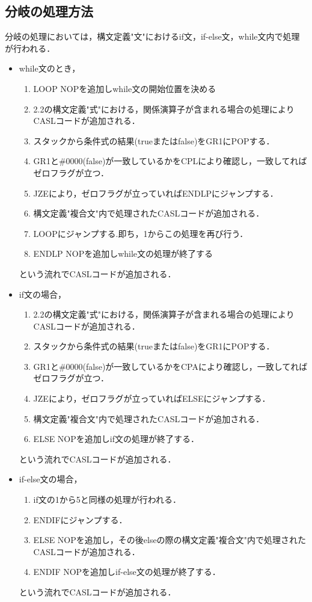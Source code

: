 \documentclass[dvipdfmx]{jarticle}
\begin{document}
\subsection{分岐の処理方法}
分岐の処理においては，構文定義"文"におけるif文，if-else文，while文内で処理が行われる．
\begin{itemize}
  \item while文のとき，
  \begin{enumerate}
    \item LOOP NOPを追加しwhile文の開始位置を決める
    \item 2.2の構文定義"式"における，関係演算子が含まれる場合の処理によりCASLコードが追加される．
    \item スタックから条件式の結果(trueまたはfalse)をGR1にPOPする．
    \item GR1と\#0000(false)が一致しているかをCPLにより確認し，一致してればゼロフラグが立つ．
    \item JZEにより，ゼロフラグが立っていればENDLPにジャンプする．
    \item 構文定義"複合文"内で処理されたCASLコードが追加される．
    \item LOOPにジャンプする.即ち，1からこの処理を再び行う．
    \item ENDLP NOPを追加しwhile文の処理が終了する
  \end{enumerate}
  という流れでCASLコードが追加される．
  \item if文の場合，
  \begin{enumerate}
    \item 2.2の構文定義"式"における，関係演算子が含まれる場合の処理によりCASLコードが追加される．
    \item スタックから条件式の結果(trueまたはfalse)をGR1にPOPする．
    \item GR1と\#0000(false)が一致しているかをCPAにより確認し，一致してればゼロフラグが立つ．
    \item JZEにより，ゼロフラグが立っていればELSEにジャンプする．
    \item 構文定義"複合文"内で処理されたCASLコードが追加される．
    \item ELSE NOPを追加しif文の処理が終了する．
  \end{enumerate}
  という流れでCASLコードが追加される．
  \item if-else文の場合，
  \begin{enumerate}
    \item if文の1から5と同様の処理が行われる．
    \item ENDIFにジャンプする．
    \item ELSE NOPを追加し，その後elseの際の構文定義"複合文"内で処理されたCASLコードが追加される．
    \item ENDIF NOPを追加しif-else文の処理が終了する．
  \end{enumerate}
  という流れでCASLコードが追加される．
\end{itemize}
\end{document}
